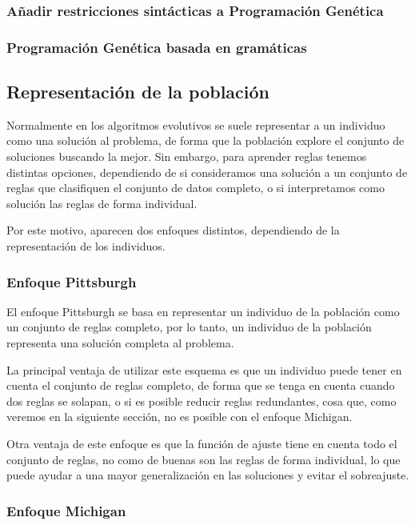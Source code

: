 \subsubsection{Añadir restricciones sintácticas a Programación Genética}


\subsubsection{Programación Genética basada en gramáticas}





\subsection{Representación de la población}

Normalmente en los algoritmos evolutivos se suele representar a un individuo como una solución al problema, de forma que la población explore el conjunto de soluciones buscando la mejor. Sin embargo, para aprender reglas tenemos distintas opciones, dependiendo de si consideramos una solución a un conjunto de reglas que clasifiquen el conjunto de datos completo, o si interpretamos como solución las reglas de forma individual.

Por este motivo, aparecen dos enfoques distintos, dependiendo de la representación de los individuos.

\subsubsection{Enfoque Pittsburgh}

El enfoque Pittsburgh se basa en representar un individuo de la población como un conjunto de reglas completo, por lo tanto, un individuo de la población representa una solución completa al problema.

La principal ventaja de utilizar este esquema es que un individuo puede tener en cuenta el conjunto de reglas completo, de forma que se tenga en cuenta cuando dos reglas se solapan, o si es posible reducir reglas redundantes, cosa que, como veremos en la siguiente sección, no es posible con el enfoque Michigan.

Otra ventaja de este enfoque es que la función de ajuste tiene en cuenta todo el conjunto de reglas, no como de buenas son las reglas de forma individual, lo que puede ayudar a una mayor generalización en las soluciones y evitar el sobreajuste.

\subsubsection{Enfoque Michigan}

